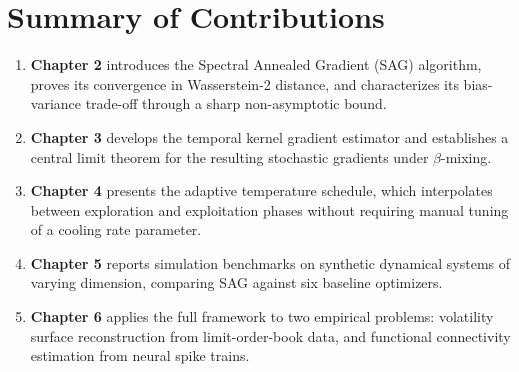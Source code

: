 \section{Summary of Contributions}

\begin{enumerate}[leftmargin=*,itemsep=6pt,label={\color{ChicagoMaroon}\bfseries\arabic*.}]
  \item \textbf{Chapter 2} introduces the Spectral Annealed Gradient (SAG) algorithm, proves its convergence in Wasserstein-2 distance, and characterizes its bias-variance trade-off through a sharp non-asymptotic bound.
  \item \textbf{Chapter 3} develops the temporal kernel gradient estimator and establishes a central limit theorem for the resulting stochastic gradients under $\beta$-mixing.
  \item \textbf{Chapter 4} presents the adaptive temperature schedule, which interpolates between exploration and exploitation phases without requiring manual tuning of a cooling rate parameter.
  \item \textbf{Chapter 5} reports simulation benchmarks on synthetic dynamical systems of varying dimension, comparing SAG against six baseline optimizers.
  \item \textbf{Chapter 6} applies the full framework to two empirical problems: volatility surface reconstruction from limit-order-book data, and functional connectivity estimation from neural spike trains.
\end{enumerate}
